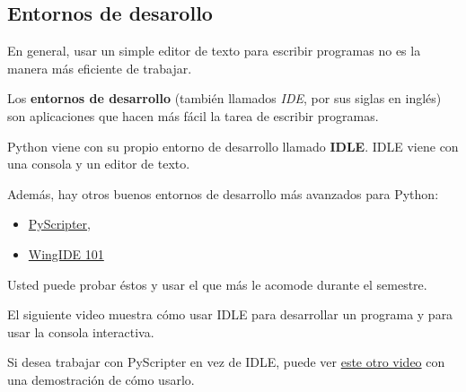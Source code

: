 \subsection{Entornos de desarollo}

En general, usar un simple editor de texto para escribir programas no es
la manera más eficiente de trabajar.

Los \textbf{entornos de desarrollo} (también llamados \emph{IDE}, por
sus siglas en inglés) son aplicaciones que hacen más fácil la tarea de
escribir programas.

Python viene con su propio entorno de desarrollo llamado \textbf{IDLE}.
IDLE viene con una consola y un editor de texto.

Además, hay otros buenos entornos de desarrollo más avanzados para
Python:

\begin{itemize}
\item
  \href{http://code.google.com/p/pyscripter/downloads/list}{PyScripter},
\item
  \href{http://www.wingware.com/downloads/wingide-101/3.2.12-1/binaries}{WingIDE
  101}
\end{itemize}

Usted puede probar éstos y usar el que más le acomode durante el
semestre.

El siguiente video muestra cómo usar IDLE para desarrollar un programa y
para usar la consola interactiva.

Si desea trabajar con PyScripter en vez de IDLE, puede ver
\href{http://www.youtube.com/watch?v=bzF5rDtQLS4}{este otro video} con
una demostración de cómo usarlo.

